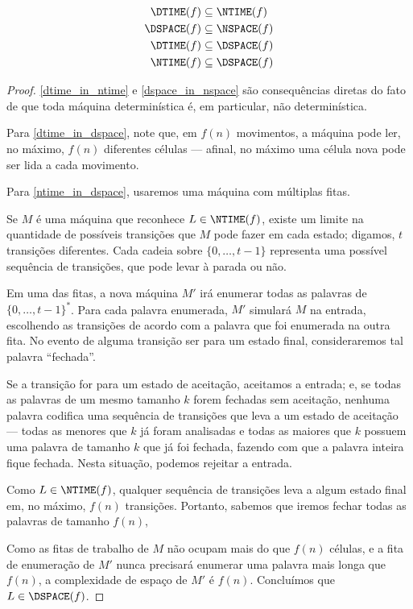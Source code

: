 \begin{proposition}
    \begin{align}
        \DTIME(f) &\subseteq \NTIME(f) \label{dtime_in_ntime} \\
        \DSPACE(f) &\subseteq \NSPACE(f) \label{dspace_in_nspace} \\
        \DTIME(f) &\subseteq \DSPACE(f) \label{dtime_in_dspace} \\
        \NTIME(f) &\subseteq \DSPACE(f) \label{ntime_in_dspace}
    \end{align}
\end{proposition}
\begin{proof}
    \ref{dtime_in_ntime} e \ref{dspace_in_nspace} são consequências diretas
    do fato de que toda máquina determinística é,
    em particular, não determinística.

    Para \ref{dtime_in_dspace},
    note que, em $f(n)$ movimentos,
    a máquina pode ler, no máximo,
    $f(n)$ diferentes células
    --- afinal, no máximo uma célula nova pode ser lida a cada movimento.

    Para \ref{ntime_in_dspace},
    usaremos uma máquina com múltiplas fitas.

    Se $M$ é uma máquina que reconhece $L \in \NTIME(f)$,
    existe um limite na quantidade de possíveis transições
    que $M$ pode fazer em cada estado;
    digamos, $t$ transições diferentes.
    Cada cadeia sobre $\{0, \dots, t-1\}$ representa uma possível
    sequência de transições,
    que pode levar à parada ou não.

    Em uma das fitas,
    a nova máquina $M'$
    irá enumerar todas as palavras de $\{0, \dots, t-1\}^*$.
    Para cada palavra enumerada,
    $M'$ simulará $M$ na entrada,
    escolhendo as transições de acordo com a palavra
    que foi enumerada na outra fita.
    No evento de alguma transição ser para um estado final,
    consideraremos tal palavra ``fechada''.

    Se a transição for para um estado de aceitação,
    aceitamos a entrada;
    e, se todas as palavras de um mesmo tamanho $k$
    forem fechadas sem aceitação,
    nenhuma palavra
    codifica uma sequência de transições
    que leva a um estado de aceitação
    --- todas as menores que $k$ já foram analisadas
    e todas as maiores que $k$
    possuem uma palavra de tamanho $k$ que já foi fechada,
    fazendo com que a palavra inteira fique fechada.
    Nesta situação, podemos rejeitar a entrada.

    Como $L \in \NTIME(f)$,
    qualquer sequência de transições leva a algum estado final
    em, no máximo, $f(n)$ transições.
    Portanto,
    sabemos que iremos fechar todas as palavras
    de tamanho $f(n)$,

    Como as fitas de trabalho de $M$
    não ocupam mais do que $f(n)$ células,
    e a fita de enumeração de $M'$
    nunca precisará enumerar uma palavra mais longa que $f(n)$,
    a complexidade de espaço de $M'$ é $f(n)$.
    Concluímos que $L \in \DSPACE(f)$.
\end{proof}


